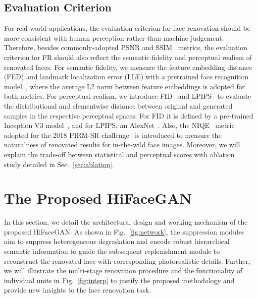 \documentclass[sigconf]{acmart}
\begin{document}
\subsection{Evaluation Criterion}\label{sec:eval}
For real-world applications, the evaluation criterion for face renovation should be more consistent with human perception rather than machine judgement. Therefore, besides commonly-adopted PSNR and SSIM~\cite{SSIM}\cite{MultiscaleSSIM} metrics, the evaluation criterion for FR should also reflect the semantic fidelity and perceptual realism of renovated faces. For semantic fidelity, we measure the feature embedding distance (FED) and landmark localization error (LLE) with a pretrained face recognition model~\cite{dlib_paper}, where the average L2 norm between feature embeddings is adopted for both metrics. For perceptual realism, we introduce FID~\cite{FID} and LPIPS~\cite{LPIPS} to evaluate the distributional and elementwise distance between original and generated samples in the respective perceptual spaces: For FID it is defined by a pre-trained Inception V3 model~\cite{inceptionv3}, and for LPIPS, an AlexNet~\cite{AlexNet}. Also, the NIQE~\cite{niqe} metric adopted for the 2018 PIRM-SR challenge~\cite{esrgan} is introduced to measure the naturalness of renovated results for in-the-wild face images. Moreover, we will explain the trade-off between statistical and perceptual scores with ablation study detailed in Sec.~\ref{sec:ablation}.

\section{The Proposed HiFaceGAN}

In this section, we detail the architectural design and working mechanism of the proposed HiFaceGAN. As shown in Fig.~\ref{fig:network}, the suppression modules aim to suppress heterogeneous degradation and encode robust hierarchical semantic information to guide the subsequent replenishment module to reconstruct the renovated face with corresponding photorealistic details. Further, we will illustrate the multi-stage renovation procedure and the functionality of individual units in Fig.~\ref{fig:interp} to justify the proposed methodology and provide new insights to the face renovation task.
\end{document}
